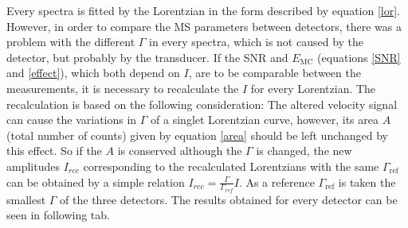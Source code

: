 Every spectra is fitted by the Lorentzian in the form described by equation \ref{lor}. However, in order to compare the MS parameters between detectors, there was a problem with the different $\Gamma$ in every spectra, which is not caused by the detector, but probably by the transducer. If the SNR and $E_{\textrm{MC}}$ (equations \ref{SNR} and \ref{effect}), which both depend on $I$, are to be comparable between the measurements, it is necessary to recalculate the $I$ for every Lorentzian. The recalculation is based on the following consideration: The altered velocity signal can cause the variations in $\Gamma$ of a singlet Lorentzian curve, however, its area $A$ (total number of counts) given by equation \ref{area} should be left unchanged by this effect. So if the $A$ is conserved although the $\Gamma$ is changed, the new amplitudes $I_{rec}$ corresponding to the recalculated Lorentzians with the same $\Gamma_{\textrm{ref}}$  can be obtained by a simple relation $I_{rec} = \frac{\Gamma}{\Gamma_{ref}}I$. As a reference $\Gamma_{\textrm{ref}}$ is taken the smallest $\Gamma$ of the three detectors.
The results obtained for every detector can be seen in following tab.
